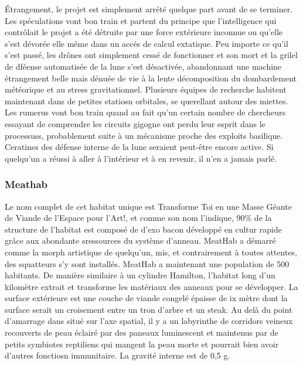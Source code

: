                                                                      Étrangement, le projet est simplement arrété quelque part avant de se terminer. Les spéculations vont bon train et partent du principe que l'intelligence qui contrôlait le projet a été détruite par une force extérieure inconnue ou qu'elle s'est dévorée elle même dans un accés de calcul extatique. Peu importe ce qu'il s'est passé, les drônes ont simplement cessé de fonctionner et son mort et la grilel de dféense automatisée de la lune s'est désactivée, abandonnant une machine étrangement belle mais dénuée de vie à la lente décomposition du dombardement météorique et au stress gravitationnel. Plusieurs équipes de recherche habitent maintenant dans de petites statiosn orbitales, se querellant autour des miettes. Les rumerus vont bon train quand au fait qu'un certain nombre de chercheurs essayant de comprendre les circuits gigogne ont perdu leur esprit dans le processuss, probablement suite à un mécanisme proche des exploits basilique. Ceratines des défense interne de la lune seraient peut-être encore active. Si quelqu'un a réussi à aller à l'intérieur et à en revenir, il n'en a jamais parlé. 

                                                                     \subsubsection{Meathab} \label{sec:meathab} 

                                                                     Le nom complet de cet habitat unique est Transforme Toi en une Masse Géante de Viande de l'Espace pour l'Art!, et comme son nom l'indique, 90\% de la structure de l'habitat est composé de d'exo bacon développé en cultur rapide grâce aux abondante sressources du système d'anneau. MeatHab a démarré comme la morph artistique de quelqu'un, mis, et contrairement à toutes attentes, des squatteurs s'y sont installés. MeatHab a maintenant une population de 500 habitants. De manière similaire à un cylindre Hamilton, l'habitat long d'un kilomètre extrait et transforme les matériaux des anneaux pour se développer. La surface extérieure est une couche de viande congelé épaisse de ix mètre dont la surface serait un croisement entre un tron d'arbre et un steak. Au delà du point d'amarrage dans situé sur l'axe spatial, il y a un labyrinthe de corridors veineux recouverts de peau éclairé par des paneaux luminescent et maintenus par de petits symbiotes reptiliens qui mangent la peau morte et pourrait bien avoir d'autres fonctiosn immunitaire. La gravité interne est de 0,5 g. 

